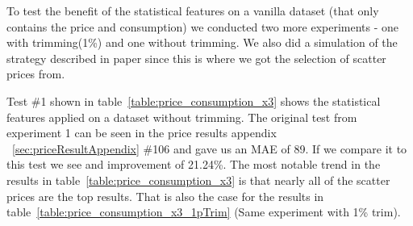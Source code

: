 \begin{table}[H]
\centering  %
\caption{Trims} %
\label{table:Statistical3} %
\end{table}

To test the benefit of the statistical features on a vanilla dataset (that only contains the price and consumption) we conducted two more experiments - one with trimming(1\%) and one without trimming. We also did a simulation of the strategy described in paper \cite{singhal2011electricity} since this is where we got the selection of scatter prices from.

Test \#1 shown in table~\ref{table:price_consumption_x3} shows the statistical features applied on a dataset without trimming. The original test from experiment 1 can be seen in the price results appendix ~\ref{sec:priceResultAppendix} \#106 and gave us an MAE of 89. If we compare it to this test we see and improvement of 21.24\%. The most notable trend in the results in table~\ref{table:price_consumption_x3} is that nearly all of the scatter prices are the top results. That is also the case for the results in table~\ref{table:price_consumption_x3_1pTrim} (Same experiment with 1\% trim).

